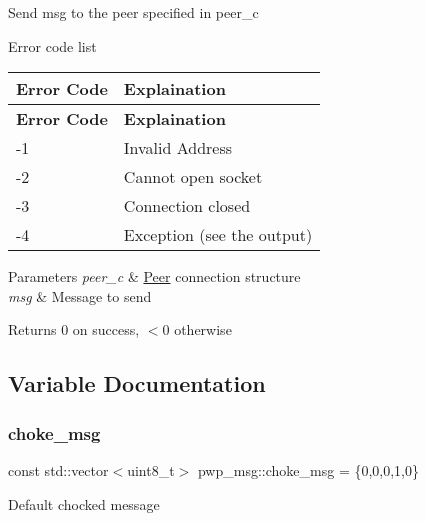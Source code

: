 Send {\ttfamily msg} to the peer specified in {\ttfamily peer\+\_\+c} 

Error code list

\tabulinesep=1mm
\begin{longtabu} spread 0pt [c]{*{2}{|X[-1]}|}
\hline
\rowcolor{\tableheadbgcolor}\textbf{ Error Code }&\textbf{ Explaination  }\\
\endfirsthead
\hline
\endfoot
\hline
\rowcolor{\tableheadbgcolor}\textbf{ Error Code }&\textbf{ Explaination  }\\
\endhead
-\/1 &Invalid Address \\
-\/2 &Cannot open socket \\
-\/3 &Connection closed \\
-\/4 &Exception (see the output) \\
\end{longtabu}

\begin{DoxyParams}{Parameters}
{\em peer\+\_\+c} & \hyperlink{classPeer}{Peer} connection structure \\
\hline
{\em msg} & Message to send \\
\hline
\end{DoxyParams}
\begin{DoxyReturn}{Returns}
0 on success, $<$0 otherwise 
\end{DoxyReturn}


\subsection{Variable Documentation}
\mbox{\label{namespacepwp__msg_a695ee2efb59a7c258559f19440fe6998}} 
\subsubsection{\texorpdfstring{choke\+\_\+msg}{choke\_msg}}
{\footnotesize\ttfamily const std\+::vector$<$uint8\+\_\+t$>$ pwp\+\_\+msg\+::choke\+\_\+msg = \{0,0,0,1,0\}}

Default chocked message \mbox{\label{namespacepwp__msg_afc68b17ce131c52fa0beb0cc7185778b}} 
